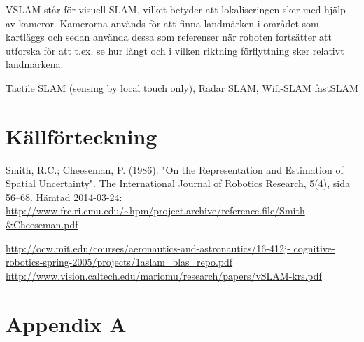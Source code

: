 \documentclass[a4paper,12pt,fleqn]{article}
\begin{document}
VSLAM står för visuell SLAM, vilket betyder att lokaliseringen sker med
hjälp av kameror. Kamerorna används för att finna landmärken i området
som kartläggs och sedan använda dessa som referenser när roboten
fortsätter att utforska för att t.ex. se hur långt och i vilken riktning
förflyttning sker relativt landmärkena.


Tactile SLAM (sensing by local touch only), Radar SLAM, Wifi-SLAM
fastSLAM

\newpage \section{Källförteckning} Smith, R.C.; Cheeseman, P. (1986).
"On the Representation and Estimation of Spatial Uncertainty". The
International Journal of Robotics Research, 5(4), sida 56–68. Hämtad
2014-03-24:
\url{http://www.frc.ri.cmu.edu/~hpm/project.archive/reference.file/Smith
&Cheeseman.pdf}

\url{http://ocw.mit.edu/courses/aeronautics-and-astronautics/16-412j-
cognitive-robotics-spring-2005/projects/1aslam_blas_repo.pdf}
\url{http://www.vision.caltech.edu/mariomu/research/papers/vSLAM-krs.pdf
}

% 
\newpage \appendix \pagestyle{empty}
 \section{Appendix A}
\end{document}
